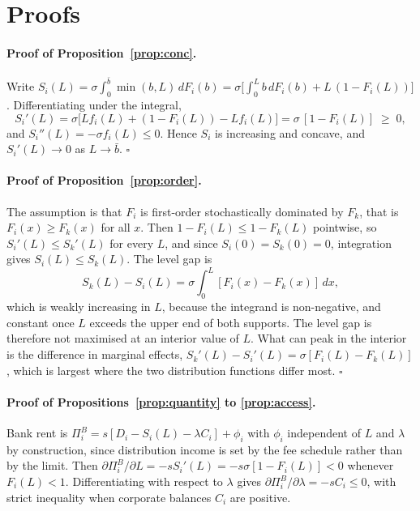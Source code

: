\documentclass[11pt]{article}
\theoremstyle{plain}\newtheorem{proposition}{Proposition}
\begin{document}
\section{Proofs}\label{app:proofs}

\paragraph{Proof of Proposition~\ref{prop:conc}.}
Write $S_i(L) = \sigma \int_0^{\bar b} \min(b,L)\,dF_i(b) = \sigma\bigl[\int_0^{L} b\,dF_i(b) + L\,(1-F_i(L))\bigr]$. Differentiating under the integral,
\[
S_i'(L) = \sigma\bigl[L f_i(L) + (1-F_i(L)) - L f_i(L)\bigr] = \sigma\,[1-F_i(L)] \;\ge\; 0,
\]
and $S_i''(L) = -\sigma f_i(L) \le 0$. Hence $S_i$ is increasing and concave, and $S_i'(L)\to 0$ as $L \to \bar b$. \hfill$\square$

\paragraph{Proof of Proposition~\ref{prop:order}.}
The assumption is that $F_i$ is first-order stochastically dominated by $F_k$, that is $F_i(x) \ge F_k(x)$ for all $x$. Then $1-F_i(L) \le 1-F_k(L)$ pointwise, so $S_i'(L) \le S_k'(L)$ for every $L$, and since $S_i(0)=S_k(0)=0$, integration gives $S_i(L)\le S_k(L)$. The level gap is
\[
S_k(L)-S_i(L) = \sigma\int_0^L [F_i(x)-F_k(x)]\,dx,
\]
which is weakly increasing in $L$, because the integrand is non-negative, and constant once $L$ exceeds the upper end of both supports. The level gap is therefore not maximised at an interior value of $L$. What can peak in the interior is the difference in marginal effects, $S_k'(L)-S_i'(L)=\sigma[F_i(L)-F_k(L)]$, which is largest where the two distribution functions differ most. \hfill$\square$

\paragraph{Proof of Propositions~\ref{prop:quantity} to \ref{prop:access}.}
Bank rent is $\Pi^B_i = s[D_i - S_i(L) - \lambda C_i] + \phi_i$ with $\phi_i$ independent of $L$ and $\lambda$ by construction, since distribution income is set by the fee schedule rather than by the limit. Then $\partial \Pi^B_i/\partial L = -s S_i'(L) = -s\sigma[1-F_i(L)] < 0$ whenever $F_i(L)<1$. Differentiating with respect to $\lambda$ gives $\partial \Pi^B_i/\partial \lambda = -sC_i \le 0$, with strict inequality when corporate balances $C_i$ are positive.
\end{document}
